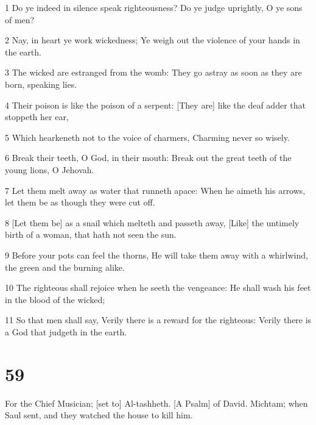 \par 1 Do ye indeed in silence speak righteousness? Do ye judge uprightly, O ye sons of men?
\par 2 Nay, in heart ye work wickedness; Ye weigh out the violence of your hands in the earth.
\par 3 The wicked are estranged from the womb: They go astray as soon as they are born, speaking lies.
\par 4 Their poison is like the poison of a serpent: [They are] like the deaf adder that stoppeth her ear,
\par 5 Which hearkeneth not to the voice of charmers, Charming never so wisely.
\par 6 Break their teeth, O God, in their mouth: Break out the great teeth of the young lions, O Jehovah.
\par 7 Let them melt away as water that runneth apace: When he aimeth his arrows, let them be as though they were cut off.
\par 8 [Let them be] as a snail which melteth and passeth away, [Like] the untimely birth of a woman, that hath not seen the sun.
\par 9 Before your pots can feel the thorns, He will take them away with a whirlwind, the green and the burning alike.
\par 10 The righteous shall rejoice when he seeth the vengeance: He shall wash his feet in the blood of the wicked;
\par 11 So that men shall say, Verily there is a reward for the righteous: Verily there is a God that judgeth in the earth.

\chapter{59}

\par For the Chief Musician; [set to] Al-tashheth. [A Psalm] of David. Michtam; when Saul sent, and they watched the house to kill him.


